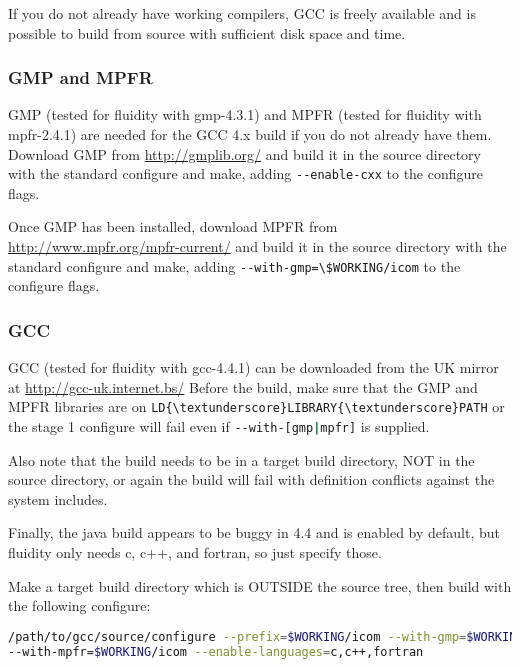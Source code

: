 If you do not already have working compilers, GCC is freely available and is
possible to build from source with sufficient disk space and time.

\subsubsection{GMP and MPFR}
\label{sect:required_libraries_compilers_gmp_mpfr}

GMP (tested for fluidity with gmp-4.3.1) and MPFR (tested for fluidity with
mpfr-2.4.1) are needed for the GCC 4.x build if you do not already have them.
Download GMP from \url{http://gmplib.org/} and build it in the source directory
with the standard configure and make, adding
\lstinline[language=bash]+--enable-cxx+ to the configure flags.

Once GMP has been installed, download MPFR from
\url{http://www.mpfr.org/mpfr-current/} and build it in the source directory
with the standard configure and make, adding
\lstinline[language=bash]+--with-gmp=\$WORKING/icom+ to the configure flags.

\subsubsection{GCC}
\label{sect:required_libraries_compilers_gcc}

GCC (tested for fluidity with gcc-4.4.1) can be downloaded from the UK mirror
at \url{http://gcc-uk.internet.bs/} Before the build, make sure that the GMP
and MPFR libraries are on
\lstinline[language=bash]+LD{\textunderscore}LIBRARY{\textunderscore}PATH+ or
the stage 1 configure will fail even if
\lstinline[language=bash]+--with-[gmp|mpfr]+ is supplied.

Also note that the build needs to be in a target build directory, NOT in the
source directory, or again the build will fail with definition conflicts
against the system includes.

Finally, the java build appears to be buggy in 4.4 and is enabled by default,
but fluidity only needs c, c++, and fortran, so just specify those.

Make a target build directory which is OUTSIDE the source tree, then build
with the following configure:

\begin{lstlisting}[language=bash]
/path/to/gcc/source/configure --prefix=$WORKING/icom --with-gmp=$WORKING/icom
--with-mpfr=$WORKING/icom --enable-languages=c,c++,fortran
\end{lstlisting}

